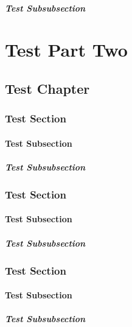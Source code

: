 \documentclass{book}
\begin{document}
\subsubsection{Test Subsubsection}

\part{Test Part Two}
\chapter{Test Chapter}
\section{Test Section}
\subsection{Test Subsection}
\subsubsection{Test Subsubsection}
\section{Test Section}
\subsection{Test Subsection}
\subsubsection{Test Subsubsection}
\section{Test Section}
\subsection{Test Subsection}
\subsubsection{Test Subsubsection}
\end{document}
